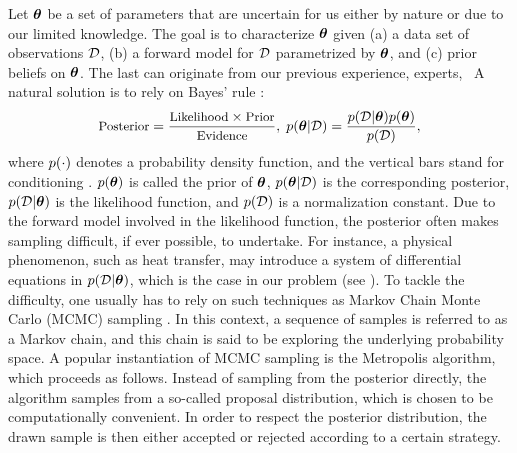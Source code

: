 Let ${\boldsymbol\theta}$ be a set of parameters that are uncertain for us either by nature or due to our limited knowledge. The goal is to characterize ${\boldsymbol\theta}$ given (a) a data set of observations $\mathcal{D}$, (b) a forward model for $\mathcal{D}$ parametrized by ${\boldsymbol\theta}$, and (c) prior beliefs on ${\boldsymbol\theta}$. The last can originate from our previous experience, experts, \etc\ A natural solution is to rely on Bayes' rule \cite{gelman2004}:
\[
  \text{\small Posterior} = \frac{\text{\small Likelihood} \times \text{\small Prior}}{\text{\small Evidence}}, \; \f{\vparam | \Data} = \frac{\f{\Data | \vparam} \f{\vparam}}{\f{\Data}},
\]
where $\f{\cdot}$ denotes a probability density function, and the vertical bars stand for conditioning \cite{durrett2010}. $\f{\vparam}$ is called the prior of ${\boldsymbol\theta}$, $\f{\vparam | \Data}$ is the corresponding posterior, $\f{\Data | \vparam}$ is the likelihood function, and $\f{\Data}$ is a normalization constant.
Due to the forward model involved in the likelihood function, the posterior often makes sampling difficult, if ever possible, to undertake.
For instance, a physical phenomenon, such as heat transfer, may introduce a system of differential equations in $\f{\Data | \vparam}$, which is the case in our problem (see ).
To tackle the difficulty, one usually has to rely on such techniques as Markov Chain Monte Carlo (MCMC) sampling \cite{gelman2004}.
In this context, a sequence of samples is referred to as a Markov chain, and this chain is said to be exploring the underlying probability space.
A popular instantiation of MCMC sampling is the Metropolis algorithm, which proceeds as follows. Instead of sampling from the posterior directly, the algorithm samples from a so-called proposal distribution, which is chosen to be computationally convenient. In order to respect the posterior distribution, the drawn sample is then either accepted or rejected according to a certain strategy.
